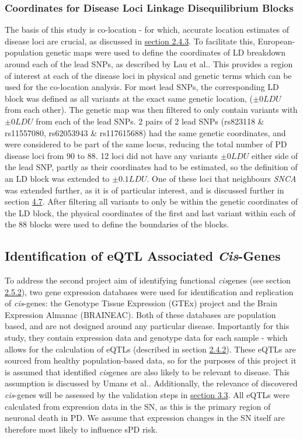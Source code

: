 \documentclass{article}
\begin{document}
\subsubsection{Coordinates for Disease Loci Linkage Disequilibrium Blocks}
\label{subsubsec:LDblock}
The basis of this study is co-location - for which, accurate location estimates of disease loci are crucial, as discussed in \hyperref[subsubsec:co-location]{section 2.4.3}. To facilitate this, European-population genetic maps were used to define the coordinates of LD breakdown around each of the lead SNPs, as described by Lau et al.\cite{Lau2017High-ResolutionEuropeans}. This provides a region of interest at each of the disease loci in physical and genetic terms which can be used for the co-location analysis. For most lead SNPs, the corresponding LD block was defined as all variants at the exact same genetic location, ($\pm0LDU$ from each other). The genetic map was then filtered to only contain variants with $\pm0LDU$ from each of the lead SNPs. 2 pairs of 2 lead SNPs (rs823118 \& rs11557080, rs62053943 \& rs117615688) had the same genetic coordinates, and were considered to be part of the same locus, reducing the total number of PD disease loci from 90 to 88. 12 loci did not have any variants $\pm0LDU$ either side of the lead SNP, partly as their coordinates had to be estimated, so the definition of an LD block was extended to $\pm0.1LDU$. One of these loci that neighbours \textit{SNCA} was extended further, as it is of particular interest, and is discussed further in section \hyperref[subsec:SNCA]{4.7}. After filtering all variants to only be within the genetic coordinates of the LD block, the physical coordinates of the first and last variant within each of the 88 blocks were used to define the boundaries of the blocks. 
\subsection{Identification of eQTL Associated \textit{Cis}-Genes}
\label{subsec:eQTL}
To address the second project aim of identifying functional \textit{cis}genes (see section \hyperref[subsubsec:Aims]{2.5.2}),  two gene expression databases were used for identification and replication of \textit{cis}-genes: the Genotype Tissue Expression (GTEx) project\cite{Lonsdale2013TheProject} and the Brain Expression Almanac (BRAINEAC)\cite{Ramasamy2014GeneticBrain}. Both of these databases are population based, and are not designed around any particular disease. Importantly for this study, they contain expression data and genotype data for each sample - which allows for the calculation of eQTLs (described in section \hyperref[subsubsec:QTL]{2.4.2}). These eQTLs are sourced from healthy population-based data, so for the purposes of this project it is assumed that identified \textit{cis}genes are also likely to be relevant to disease. This assumption is discussed by Umans et al.\cite{Umans2021WhereEQTLs}. Additionally, the relevance of discovered \textit{cis}-genes will be assessed by the validation steps in \hyperref[subsec:validation]{section 3.3}. All eQTLs were calculated from expression data in the SN, as this is the primary region of neuronal death in PD. We assume that expression changes in the SN itself are therefore most likely to influence sPD risk.
\end{document}
